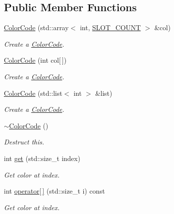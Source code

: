 \subsection*{Public Member Functions}
\begin{DoxyCompactItemize}
\item 
\hyperlink{classmastermind_1_1logic_1_1_color_code_abcbc2b11eac727d545b8a4dcec833054}{Color\+Code} (std\+::array$<$ int, \hyperlink{classmastermind_1_1_mastermind_ad4cfc8127641ff8dfe89d65ae232331c}{S\+L\+O\+T\+\_\+\+C\+O\+U\+NT} $>$ \&col)
\begin{DoxyCompactList}\small\item\em Create a \hyperlink{classmastermind_1_1logic_1_1_color_code}{Color\+Code}. \end{DoxyCompactList}\item 
\hyperlink{classmastermind_1_1logic_1_1_color_code_ac94a451ad586fc094994d647cf0ae516}{Color\+Code} (int col\mbox{[}$\,$\mbox{]})
\begin{DoxyCompactList}\small\item\em Create a \hyperlink{classmastermind_1_1logic_1_1_color_code}{Color\+Code}. \end{DoxyCompactList}\item 
\hyperlink{classmastermind_1_1logic_1_1_color_code_a4ef09f85d7316ec785541ee326d3def6}{Color\+Code} (std\+::list$<$ int $>$ \&list)
\begin{DoxyCompactList}\small\item\em Create a \hyperlink{classmastermind_1_1logic_1_1_color_code}{Color\+Code}. \end{DoxyCompactList}\item 
\hyperlink{classmastermind_1_1logic_1_1_color_code_aee5e4a3d13fd9e2e2c69964fdffe04cf}{$\sim$\+Color\+Code} ()
\begin{DoxyCompactList}\small\item\em Destruct this. \end{DoxyCompactList}\item 
int \hyperlink{classmastermind_1_1logic_1_1_color_code_a095c8e37b19f67c219ac674cc0948d41}{get} (std\+::size\+\_\+t index)
\begin{DoxyCompactList}\small\item\em Get color at index. \end{DoxyCompactList}\item 
int \hyperlink{classmastermind_1_1logic_1_1_color_code_addfc2314a5fcc2783edd0b6c6a70a4cc}{operator\mbox{[}$\,$\mbox{]}} (std\+::size\+\_\+t i) const
\begin{DoxyCompactList}\small\item\em Get color at index. \end{DoxyCompactList}\item 

\end{DoxyCompactItemize}
